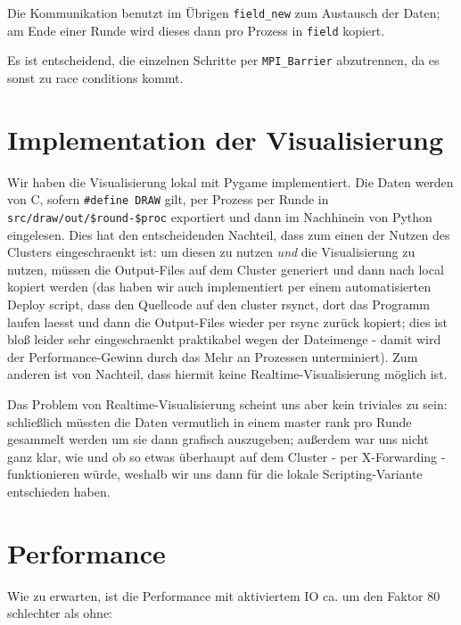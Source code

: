 Die Kommunikation benutzt im Übrigen \texttt{field\_new} zum Austausch
der Daten; am Ende einer Runde wird dieses dann pro Prozess in
\texttt{field} kopiert.

Es ist entscheidend, die einzelnen Schritte per \texttt{MPI\_Barrier}
abzutrennen, da es sonst zu race conditions kommt.

\section{Implementation der
Visualisierung}\label{implementation-der-visualisierung}

Wir haben die Visualisierung lokal mit Pygame implementiert. Die Daten
werden von C, sofern \texttt{\#define DRAW} gilt, per Prozess per Runde
in \texttt{src/draw/out/\$round-\$proc} exportiert und dann im
Nachhinein von Python eingelesen. Dies hat den entscheidenden Nachteil,
dass zum einen der Nutzen des Clusters eingeschraenkt ist: um diesen zu
nutzen \emph{und} die Visualisierung zu nutzen, müssen die Output-Files
auf dem Cluster generiert und dann nach local kopiert werden (das haben
wir auch implementiert per einem automatisierten Deploy script, dass den
Quellcode auf den cluster rsynct, dort das Programm laufen laesst und
dann die Output-Files wieder per rsync zurück kopiert; dies ist bloß
leider sehr eingeschraenkt praktikabel wegen der Dateimenge - damit wird
der Performance-Gewinn durch das Mehr an Prozessen unterminiert). Zum
anderen ist von Nachteil, dass hiermit keine Realtime-Visualisierung
möglich ist.

Das Problem von Realtime-Visualisierung scheint uns aber kein triviales
zu sein: schließlich müssten die Daten vermutlich in einem master rank
pro Runde gesammelt werden um sie dann grafisch auszugeben; außerdem war
uns nicht ganz klar, wie und ob so etwas überhaupt auf dem Cluster - per
X-Forwarding - funktionieren würde, weshalb wir uns dann für die lokale
Scripting-Variante entschieden haben.

\section{Performance}\label{performance}

Wie zu erwarten, ist die Performance mit aktiviertem IO ca. um den
Faktor 80 schlechter als ohne:

